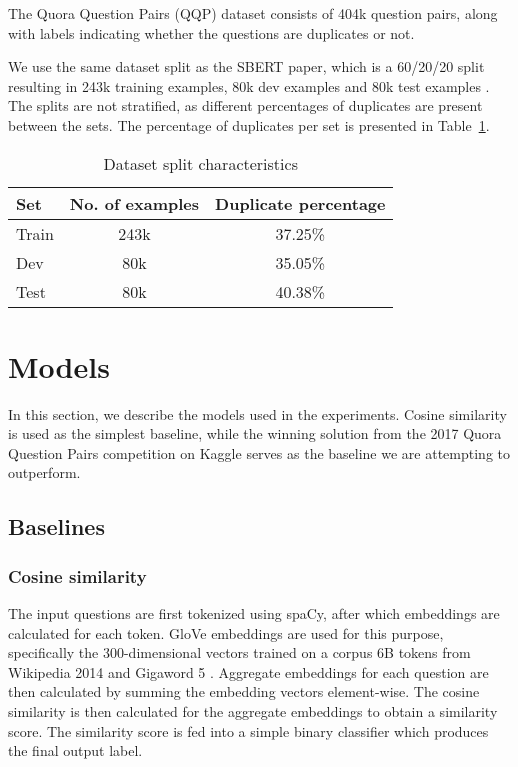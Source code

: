\documentclass[10pt, a4paper]{article}
\begin{document}
The Quora Question Pairs (QQP) dataset consists of 404k question pairs, along with labels indicating whether the questions are duplicates or not.

We use the same dataset split as the SBERT paper, which is a 60/20/20 split resulting in 243k training examples, 80k dev examples and 80k test examples \citep{reimers-2019-sentence-bert}.
The splits are not stratified, as different percentages of duplicates are present between the sets. The percentage of duplicates per set is presented in Table~\ref{tab:duplicate-percentages}.

\begin{table}[ht]
\caption{Dataset split characteristics}
\label{tab:duplicate-percentages}
\begin{center}
\begin{tabular}{lcc}
\toprule
Set & No. of examples & Duplicate percentage \\
\midrule
Train & 243k & 37.25\% \\
Dev   & 80k  & 35.05\% \\
Test  & 80k  & 40.38\% \\
\bottomrule
\end{tabular}
\end{center}
\end{table}

\section{Models}

In this section, we describe the models used in the experiments.
Cosine similarity is used as the simplest baseline, while the winning solution from the 2017 Quora Question Pairs competition on Kaggle serves as the baseline we are attempting to outperform.

\subsection{Baselines}

\subsubsection{Cosine similarity} \label{cosine-similarity}

The input questions are first tokenized using spaCy, after which embeddings are calculated for each token.
GloVe embeddings are used for this purpose, specifically the 300-dimensional vectors trained on a corpus 6B tokens from Wikipedia 2014 and Gigaword 5 \citep{pennington2014glove}.
Aggregate embeddings for each question are then calculated by summing the embedding vectors element-wise.
The cosine similarity is then calculated for the aggregate embeddings to obtain a similarity score.
The similarity score is fed into a simple binary classifier which produces the final output label.
\end{document}
